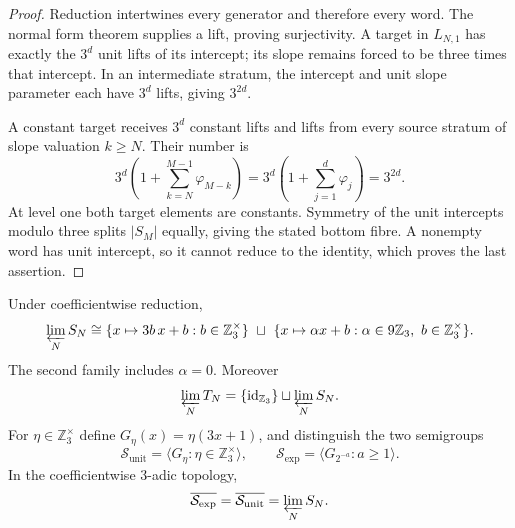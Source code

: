 \begin{proof}
Reduction intertwines every generator and therefore every word.  The normal
form theorem supplies a lift, proving surjectivity.  A target in $L_{N,1}$
has exactly the $3^d$ unit lifts of its intercept; its slope remains forced to
be three times that intercept.  In an intermediate stratum, the intercept
and unit slope parameter each have $3^d$ lifts, giving $3^{2d}$.

A constant target receives $3^d$ constant lifts and lifts from every source
stratum of slope valuation $k\geq N$.  Their number is
\[
 3^d\left(1+\sum_{k=N}^{M-1}\varphi_{M-k}\right)
 =3^d\left(1+\sum_{j=1}^{d}\varphi_j\right)=3^{2d}.
\]
At level one both target elements are constants.  Symmetry of the unit
intercepts modulo three splits $|S_M|$ equally, giving the stated bottom
fibre.  A nonempty word has unit intercept, so it cannot reduce to the
identity, which proves the last assertion.
\end{proof}

\begin{theorem}
\label{thm:finite-residue-inverse-limit}
Under coefficientwise reduction,
\begin{equation}
\label{eq:finite-residue-inverse-limit}
 \varprojlim_N S_N
 \cong
 \{x\mapsto3b\,x+b:b\in\mathbb Z_3^\times\}
 \ \sqcup\
 \{x\mapsto\alpha x+b:
       \alpha\in9\mathbb Z_3,\ b\in\mathbb Z_3^\times\}.
\end{equation}
The second family includes $\alpha=0$.  Moreover
\[
 \varprojlim_N T_N
 =\{\operatorname{id}_{\mathbb Z_3}\}
  \sqcup\varprojlim_N S_N.
\]
For $\eta\in\mathbb Z_3^\times$ define
$G_\eta(x)=\eta(3x+1)$, and distinguish the two semigroups
\[
 \mathcal S_{\mathrm{unit}}
   =\langle G_\eta:\eta\in\mathbb Z_3^\times\rangle,
 \qquad
 \mathcal S_{\mathrm{exp}}
   =\langle G_{2^{-a}}:a\geq1\rangle.
\]
In the coefficientwise $3$-adic topology,
\[
 \overline{\mathcal S_{\mathrm{exp}}}
 =\overline{\mathcal S_{\mathrm{unit}}}
 =\varprojlim_N S_N.
\]
\end{theorem}

